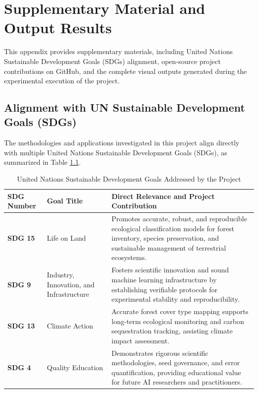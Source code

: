 \chapter{Supplementary Material and Output Results}
\label{ch:appendix}

This appendix provides supplementary materials, including United Nations Sustainable Development Goals (SDGs) alignment, open-source project contributions on GitHub, and the complete visual outputs generated during the experimental execution of the project.

\section{Alignment with UN Sustainable Development Goals (SDGs)}
\label{sec:sdg_alignment}

The methodologies and applications investigated in this project align directly with multiple United Nations Sustainable Development Goals (SDGs), as summarized in Table \ref{tab:sdg_mapping}.

\begin{table}[H]
\centering
\caption{United Nations Sustainable Development Goals Addressed by the Project}
\label{tab:sdg_mapping}
\begin{tabular}{p{2.5cm} p{3.5cm} p{8cm}}
\toprule
\textbf{SDG Number} & \textbf{Goal Title} & \textbf{Direct Relevance and Project Contribution} \\
\midrule
\textbf{SDG 15} & Life on Land & Promotes accurate, robust, and reproducible ecological classification models for forest inventory, species preservation, and sustainable management of terrestrial ecosystems. \\
\midrule
\textbf{SDG 9} & Industry, Innovation, and Infrastructure & Fosters scientific innovation and sound machine learning infrastructure by establishing verifiable protocols for experimental stability and reproducibility. \\
\midrule
\textbf{SDG 13} & Climate Action & Accurate forest cover type mapping supports long-term ecological monitoring and carbon sequestration tracking, assisting climate impact assessment. \\
\midrule
\textbf{SDG 4} & Quality Education & Demonstrates rigorous scientific methodologies, seed governance, and error quantification, providing educational value for future AI researchers and practitioners. \\
\bottomrule
\end{tabular}
\end{table}

